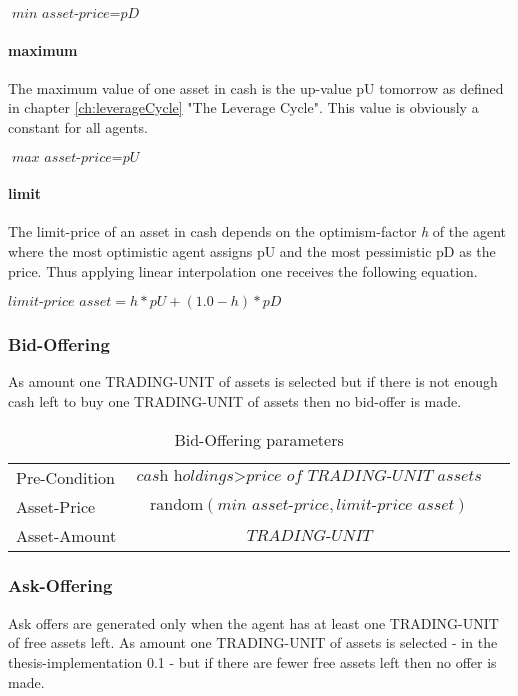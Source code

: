 \documentclass[Bachelorarbeit.tex]{subfiles}
\begin{document}
\begin{center}
$\textit{min asset-price} = \textit{pD}$
\end{center}
 
\paragraph{maximum}
The maximum value of one asset in cash is the up-value pU tomorrow as defined in chapter \ref{ch:leverageCycle} "The Leverage Cycle". This value is obviously a constant for all agents.

\begin{center}
$\textit{max asset-price} = \textit{pU}$
\end{center}

\paragraph{limit}
The limit-price of an asset in cash depends on the optimism-factor \textit{h} of the agent where the most optimistic agent assigns pU and the most pessimistic pD as the price. Thus applying linear interpolation one receives the following equation.

\begin{center}
$\textit{limit-price asset} = h * pU + ( 1.0 - h ) * pD$
\end{center}

\subsubsection{Bid-Offering}
As amount one TRADING-UNIT of assets is selected but if there is not enough cash left to buy one TRADING-UNIT of assets then no bid-offer is made.

\begin{table}[H]
	\centering
	\caption{Bid-Offering parameters}
	\begin{tabular} { l c r }
		\hline
		Pre-Condition & $\textit{cash holdings} > \textit{price of TRADING-UNIT assets}$  \\
		Asset-Price & $\mathrm{random}(\textit{min asset-price}, \textit{limit-price asset})$ \\
		Asset-Amount & $\textit{TRADING-UNIT}$ \\
		\hline
	\end{tabular}
\end{table}

\subsubsection{Ask-Offering}
Ask offers are generated only when the agent has at least one TRADING-UNIT of free assets left. As amount one TRADING-UNIT of assets is selected - in the thesis-implementation 0.1 - but if there are fewer free assets left then no offer is made.
\end{document}
